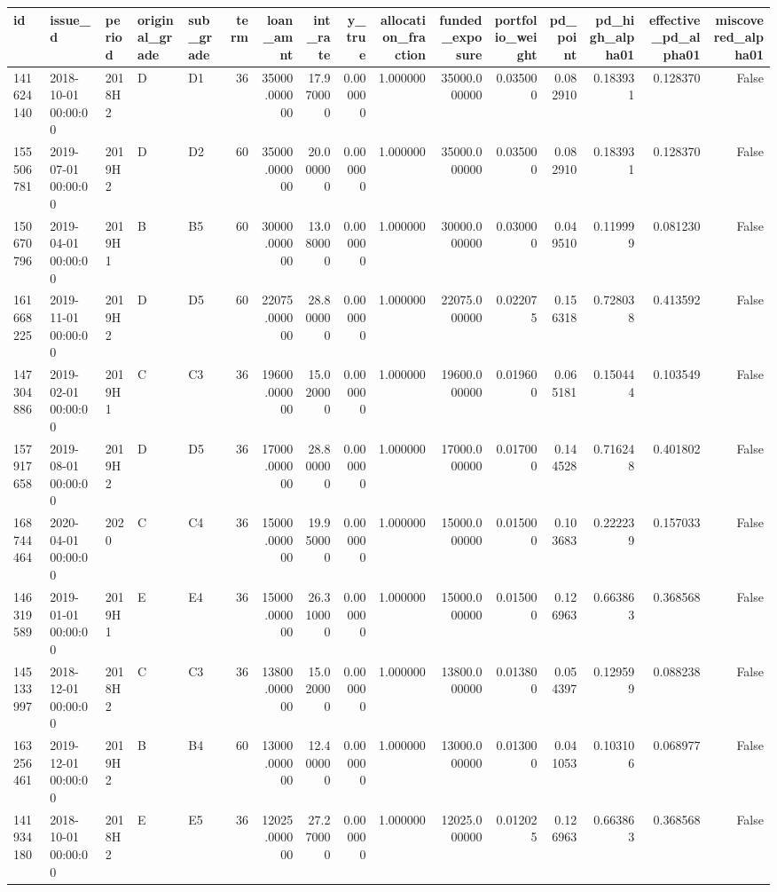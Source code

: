 \begin{tabular}{lllllrrrrrrrrrrr}
\toprule
id & issue\_d & period & original\_grade & sub\_grade & term & loan\_amnt & int\_rate & y\_true & allocation\_fraction & funded\_exposure & portfolio\_weight & pd\_point & pd\_high\_alpha01 & effective\_pd\_alpha01 & miscovered\_alpha01 \\
\midrule
141624140 & 2018-10-01 00:00:00 & 2018H2 & D & D1 & 36 & 35000.000000 & 17.970000 & 0.000000 & 1.000000 & 35000.000000 & 0.035000 & 0.082910 & 0.183931 & 0.128370 & False \\
155506781 & 2019-07-01 00:00:00 & 2019H2 & D & D2 & 60 & 35000.000000 & 20.000000 & 0.000000 & 1.000000 & 35000.000000 & 0.035000 & 0.082910 & 0.183931 & 0.128370 & False \\
150670796 & 2019-04-01 00:00:00 & 2019H1 & B & B5 & 60 & 30000.000000 & 13.080000 & 0.000000 & 1.000000 & 30000.000000 & 0.030000 & 0.049510 & 0.119999 & 0.081230 & False \\
161668225 & 2019-11-01 00:00:00 & 2019H2 & D & D5 & 60 & 22075.000000 & 28.800000 & 0.000000 & 1.000000 & 22075.000000 & 0.022075 & 0.156318 & 0.728038 & 0.413592 & False \\
147304886 & 2019-02-01 00:00:00 & 2019H1 & C & C3 & 36 & 19600.000000 & 15.020000 & 0.000000 & 1.000000 & 19600.000000 & 0.019600 & 0.065181 & 0.150444 & 0.103549 & False \\
157917658 & 2019-08-01 00:00:00 & 2019H2 & D & D5 & 36 & 17000.000000 & 28.800000 & 0.000000 & 1.000000 & 17000.000000 & 0.017000 & 0.144528 & 0.716248 & 0.401802 & False \\
168744464 & 2020-04-01 00:00:00 & 2020 & C & C4 & 36 & 15000.000000 & 19.950000 & 0.000000 & 1.000000 & 15000.000000 & 0.015000 & 0.103683 & 0.222239 & 0.157033 & False \\
146319589 & 2019-01-01 00:00:00 & 2019H1 & E & E4 & 36 & 15000.000000 & 26.310000 & 0.000000 & 1.000000 & 15000.000000 & 0.015000 & 0.126963 & 0.663863 & 0.368568 & False \\
145133997 & 2018-12-01 00:00:00 & 2018H2 & C & C3 & 36 & 13800.000000 & 15.020000 & 0.000000 & 1.000000 & 13800.000000 & 0.013800 & 0.054397 & 0.129599 & 0.088238 & False \\
163256461 & 2019-12-01 00:00:00 & 2019H2 & B & B4 & 60 & 13000.000000 & 12.400000 & 0.000000 & 1.000000 & 13000.000000 & 0.013000 & 0.041053 & 0.103106 & 0.068977 & False \\
141934180 & 2018-10-01 00:00:00 & 2018H2 & E & E5 & 36 & 12025.000000 & 27.270000 & 0.000000 & 1.000000 & 12025.000000 & 0.012025 & 0.126963 & 0.663863 & 0.368568 & False \\

\end{tabular}
